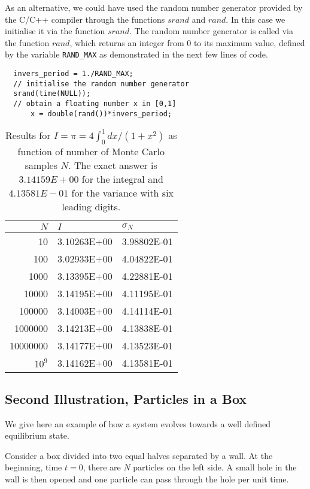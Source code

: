 As an alternative, we could have used the random number generator
provided by the C/C++ compiler through the functions $srand$ and $rand$. In this case 
we initialise it via the function
$srand$. The random number generator is called via the function $rand$, which returns an integer
from 0 to  its maximum value, defined by the variable \lstinline$RAND_MAX$ as demonstrated in the next few lines
of code. 
\lstset{language=c++}
\begin{lstlisting}
  invers_period = 1./RAND_MAX;
  // initialise the random number generator
  srand(time(NULL));
  // obtain a floating number x in [0,1]
      x = double(rand())*invers_period; 
\end{lstlisting}
\begin{table}[hbtp]
\begin{center}
\caption{Results for $I=\pi=4\int_0^1dx/(1+x^2)$ as function of number of Monte Carlo samples $N$. The exact answer is $3.14159E+00$ for the integral and $4.13581E-01$ for the variance with six leading digits.\label{tab:mcbrute}} 
\begin{tabular}{rll}\hline
$N$&$I$&$\sigma_N$\\\hline
10 & 3.10263E+00 &  3.98802E-01\\  
100  & 3.02933E+00 &  4.04822E-01       \\
1000  &   3.13395E+00 &  4.22881E-01      \\
10000  & 3.14195E+00 &  4.11195E-01      \\
100000 &  3.14003E+00 &  4.14114E-01     \\
1000000&  3.14213E+00 &  4.13838E-01   \\
10000000& 3.14177E+00 & 4.13523E-01  \\
$10^{9}$& 3.14162E+00 &  4.13581E-01  \\
\hline
\end{tabular} 
\end{center}   
\end{table}     


\subsection{Second Illustration, Particles in a Box}

We give here an example of how a system evolves towards 
a well defined equilibrium state.

Consider a box divided into two equal halves separated by a wall.
At the beginning, time $t=0$, there are $N$ particles on the left
side. A small hole in the wall is then opened and one particle
can pass through the hole per unit time. 

